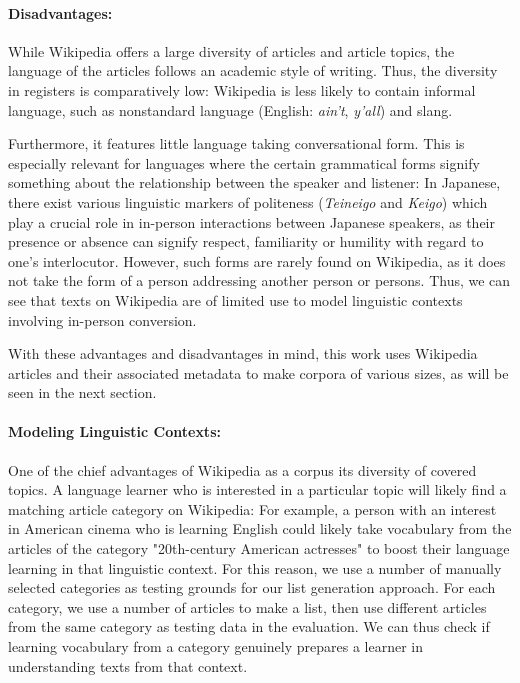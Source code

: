 \paragraph{Disadvantages:}
While Wikipedia offers a large diversity of articles and article topics, the language of the articles follows an academic style of writing.
Thus, the diversity in registers is comparatively low:
Wikipedia is less likely to contain informal language, such as nonstandard language (English: \textit{ain't}, \textit{y'all}) and slang.

Furthermore, it features little language taking conversational form.
This is especially relevant for languages where the certain grammatical forms signify something about the relationship between the speaker and listener:
In Japanese, there exist various linguistic markers of politeness (\textit{Teineigo} and \textit{Keigo}) which play a crucial role in in-person interactions between Japanese speakers, as their presence or absence can signify respect, familiarity or humility with regard to one's interlocutor.
However, such forms are rarely found on Wikipedia, as it does not take the form of a person addressing another person or persons.
Thus, we can see that texts on Wikipedia are of limited use to model linguistic contexts involving in-person conversion.

With these advantages and disadvantages in mind, this work uses Wikipedia articles and their associated metadata to make corpora of various sizes, as will be seen in the next section.

\paragraph{Modeling Linguistic Contexts:}

One of the chief advantages of Wikipedia as a corpus its diversity of covered topics.
A language learner who is interested in a particular topic will likely find a matching article category on Wikipedia:
For example, a person with an interest in American cinema who is learning English could likely take vocabulary from the articles of the category "20th-century American actresses" to boost their language learning in that linguistic context.
For this reason, we use a number of manually selected categories as testing grounds for our list generation approach.
For each category, we use a number of articles to make a list, then use different articles from the same category as testing data in the evaluation.
We can thus check if learning vocabulary from a category genuinely prepares a learner in understanding texts from that context.

